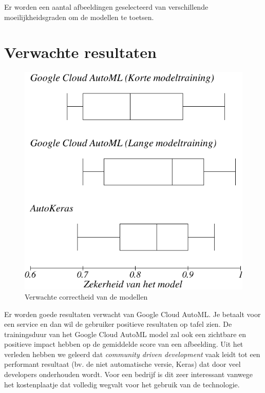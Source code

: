 Er worden een aantal afbeeldingen geselecteerd van verschillende moeilijkheidsgraden om de modellen te toetsen.

\section{Verwachte resultaten}
\label{sec:verwachte_resultaten}

\begin{figure}
    \includegraphics[width=\linewidth]{img/boxplot.png}
    \vspace{1mm}
    \caption{Verwachte correctheid van de modellen}
    \label{fig:boxplot1}
\end{figure}

Er worden goede resultaten verwacht van Google Cloud AutoML. Je betaalt voor een service en dan wil de gebruiker positieve resultaten op tafel zien. De trainingsduur van het Google Cloud AutoML model zal ook een zichtbare en positieve impact hebben op de gemiddelde score van een afbeelding. Uit het verleden hebben we geleerd dat \emph{community driven development} vaak leidt tot een performant resultaat (bv. de niet automatische versie, Keras) dat door veel developers onderhouden wordt. Voor een bedrijf is dit zeer interessant vanwege het kostenplaatje dat volledig wegvalt voor het gebruik van de technologie. 

